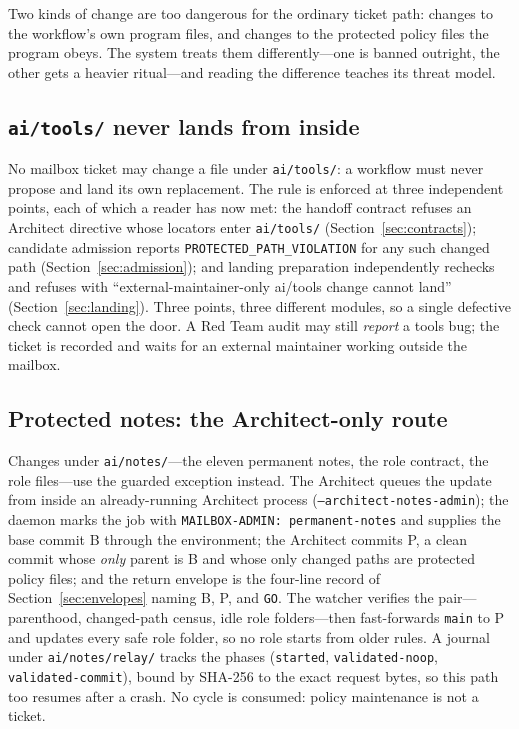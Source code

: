 \documentclass[10pt,aps,prd,twocolumn,nofootinbib]{revtex4-2}
\newcommand{\code}[1]{\texttt{#1}}
\newcommand{\file}[1]{\texttt{#1}}
\begin{document}
Two kinds of change are too dangerous for the ordinary ticket path:
changes to the workflow's own program files, and changes to the
protected policy files the program obeys.  The system treats them
differently---one is banned outright, the other gets a heavier
ritual---and reading the difference teaches its threat model.

\subsection{\file{ai/tools/} never lands from inside}

No mailbox ticket may change a file under \file{ai/tools/}: a workflow
must never propose and land its own replacement.  The rule is enforced
at three independent points, each of which a reader has now met: the
handoff contract refuses an Architect directive whose locators enter
\file{ai/tools/} (Section~\ref{sec:contracts}); candidate admission
reports \code{PROTECTED\_PATH\_VIOLATION} for any such changed path
(Section~\ref{sec:admission}); and landing preparation independently
rechecks and refuses with ``external-maintainer-only ai/tools change
cannot land'' (Section~\ref{sec:landing}).  Three points, three
different modules, so a single defective check cannot open the door.
A Red Team audit may still \emph{report} a tools bug; the ticket is
recorded and waits for an external maintainer working outside the
mailbox.

\subsection{Protected notes: the Architect-only route}
\label{sec:notes-admin}

Changes under \file{ai/notes/}---the eleven permanent notes, the role
contract, the role files---use the guarded exception instead.  The
Architect queues the update from inside an already-running Architect
process (\code{--architect-notes-admin}); the daemon marks the job
with \code{MAILBOX-ADMIN: permanent-notes} and supplies the base
commit B through the environment; the Architect commits P, a clean
commit whose \emph{only} parent is B and whose only changed paths are
protected policy files; and the return envelope is the four-line
record of Section~\ref{sec:envelopes} naming B, P, and \code{GO}.
The watcher verifies the pair---parenthood, changed-path census,
idle role folders---then fast-forwards \code{main} to P and updates
every safe role folder, so no role starts from older rules.  A journal
under \file{ai/notes/relay/} tracks the phases
(\code{started}, \code{validated-noop}, \code{validated-commit}),
bound by SHA-256 to the exact request bytes, so this path too resumes
after a crash.  No cycle is consumed: policy maintenance is not a
ticket.
\end{document}

